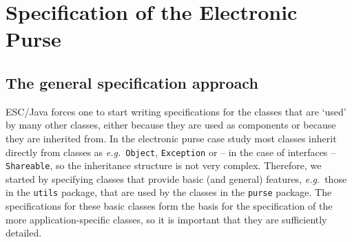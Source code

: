 \documentclass[a4paper]{llncs}
\begin{document}







\section{Specification of the Electronic Purse}
\label{SectSpecPurse}






\subsection{The general specification approach}
ESC/Java forces one to start writing specifications for the classes
that are `used' by many other classes, either because they are used as 
components or because they are inherited from. In the electronic purse 
case study most classes inherit directly from classes as
\emph{e.g.}~\texttt{Object}, \texttt{Exception} or -- in the case of
interfaces -- \texttt{Shareable}, so the inheritance structure is not
very complex. Therefore, we started by specifying classes that
provide basic (and general) features, \emph{e.g.}~those in the
\texttt{utils} package,
that are used by the classes in the \texttt{purse} package. The
specifications for these basic classes form the basis for the
specification of the more application-specific classes, so it is
important that they are sufficiently detailed.
\end{document}

